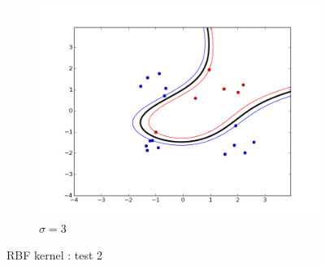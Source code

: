 \documentclass{article}
\begin{document}
\begin{figure}[!h]
\begin{subfigure}[b]{0.3\textwidth}
        \includegraphics[width=1.2\textwidth]{images/rbf/2/figure_3.png}
        \caption{$\sigma = 3$}  \label{rbf_2_figure_3}
    \end{subfigure}
    \caption{RBF kernel : test 2}
    \label{rbf_2}
\end{figure}
\end{document}
